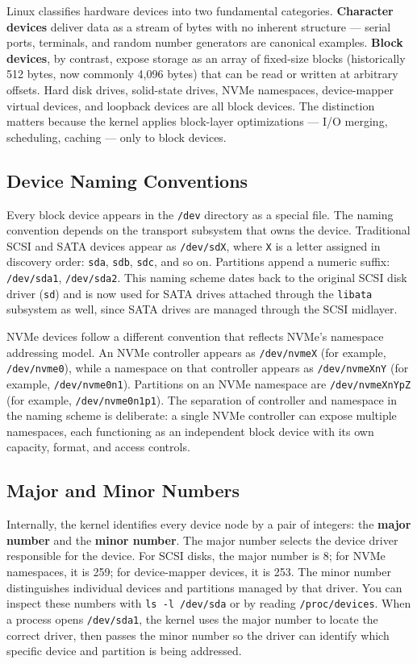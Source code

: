 Linux classifies hardware devices into two fundamental categories. \textbf{Character devices} deliver data as a stream of bytes with no inherent structure --- serial ports, terminals, and random number generators are canonical examples. \textbf{Block devices}, by contrast, expose storage as an array of fixed-size blocks (historically 512 bytes, now commonly 4,096 bytes) that can be read or written at arbitrary offsets. Hard disk drives, solid-state drives, NVMe namespaces, device-mapper virtual devices, and loopback devices are all block devices. The distinction matters because the kernel applies block-layer optimizations --- I/O merging, scheduling, caching --- only to block devices.

\subsection{Device Naming Conventions}

Every block device appears in the \texttt{/dev} directory as a special file. The naming convention depends on the transport subsystem that owns the device. Traditional SCSI and SATA devices appear as \texttt{/dev/sdX}, where \texttt{X} is a letter assigned in discovery order: \texttt{sda}, \texttt{sdb}, \texttt{sdc}, and so on. Partitions append a numeric suffix: \texttt{/dev/sda1}, \texttt{/dev/sda2}. This naming scheme dates back to the original SCSI disk driver (\texttt{sd}) and is now used for SATA drives attached through the \texttt{libata} subsystem as well, since SATA drives are managed through the SCSI midlayer.

NVMe devices follow a different convention that reflects NVMe's namespace addressing model. An NVMe controller appears as \texttt{/dev/nvmeX} (for example, \texttt{/dev/nvme0}), while a namespace on that controller appears as \texttt{/dev/nvmeXnY} (for example, \texttt{/dev/nvme0n1}). Partitions on an NVMe namespace are \texttt{/dev/nvmeXnYpZ} (for example, \texttt{/dev/nvme0n1p1}). The separation of controller and namespace in the naming scheme is deliberate: a single NVMe controller can expose multiple namespaces, each functioning as an independent block device with its own capacity, format, and access controls.

\subsection{Major and Minor Numbers}

Internally, the kernel identifies every device node by a pair of integers: the \textbf{major number} and the \textbf{minor number}. The major number selects the device driver responsible for the device. For SCSI disks, the major number is 8; for NVMe namespaces, it is 259; for device-mapper devices, it is 253. The minor number distinguishes individual devices and partitions managed by that driver. You can inspect these numbers with \texttt{ls -l /dev/sda} or by reading \texttt{/proc/devices}. When a process opens \texttt{/dev/sda1}, the kernel uses the major number to locate the correct driver, then passes the minor number so the driver can identify which specific device and partition is being addressed.

